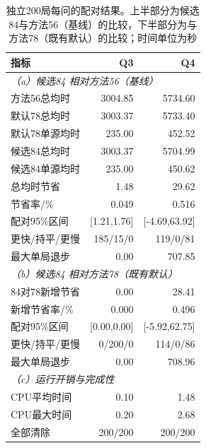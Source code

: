 ﻿\begin{table}[!htbp]\centering\small\caption{独立200局每问的配对结果。上半部分为候选84与方法56（基线）的比较，下半部分为与方法78（既有默认）的比较；时间单位为秒}\label{tab:iid}\begin{tabular}{lrr}\toprule 指标&Q3&Q4\\\midrule
\multicolumn{3}{l}{\emph{（a）候选84 相对方法56（基线）}}\\
方法56总均时&3004.85&5734.60\\
默认78总均时&3003.37&5733.40\\
默认78单源均时&235.00&452.52\\
候选84总均时&3003.37&5704.99\\
候选84单源均时&235.00&450.62\\
总均时节省&1.48&29.62\\
节省率/\%&0.049&0.516\\
配对95\%区间&[1.21,1.76]&[-4.69,63.92]\\
更快/持平/更慢&185/15/0&119/0/81\\
最大单局退步&0.00&707.85\\
\midrule
\multicolumn{3}{l}{\emph{（b）候选84 相对方法78（既有默认）}}\\
84对78新增节省&0.00&28.41\\
新增节省率/\%&0.000&0.496\\
配对95\%区间&[0.00,0.00]&[-5.92,62.75]\\
更快/持平/更慢&0/200/0&114/0/86\\
最大单局退步&0.00&708.96\\
\midrule
\multicolumn{3}{l}{\emph{（c）运行开销与完成性}}\\
CPU平均时间&0.10&1.48\\
CPU最大时间&0.20&2.68\\
全部清除&200/200&200/200\\\bottomrule\end{tabular}\end{table}
